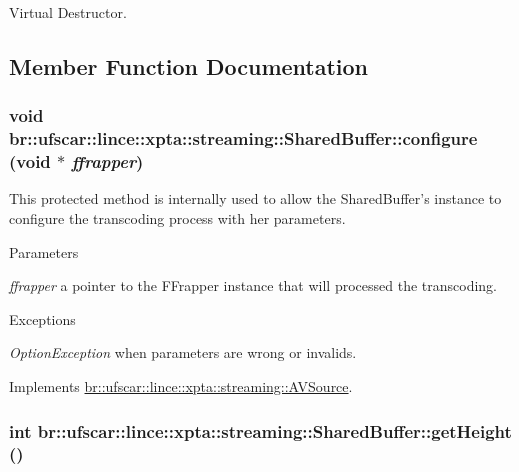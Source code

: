 Virtual Destructor. 



\subsection{Member Function Documentation}
\hypertarget{classbr_1_1ufscar_1_1lince_1_1xpta_1_1streaming_1_1SharedBuffer_af6606fe080919c0152ab9c844a82e40f}{
\subsubsection[{configure}]{\setlength{\rightskip}{0pt plus 5cm}void br::ufscar::lince::xpta::streaming::SharedBuffer::configure (void $\ast$ {\em ffrapper})}}
\label{classbr_1_1ufscar_1_1lince_1_1xpta_1_1streaming_1_1SharedBuffer_af6606fe080919c0152ab9c844a82e40f}


This protected method is internally used to allow the SharedBuffer's instance to configure the transcoding process with her parameters. 


\begin{DoxyParams}{Parameters}
\item[{\em ffrapper}]a pointer to the FFrapper instance that will processed the transcoding. \end{DoxyParams}

\begin{DoxyExceptions}{Exceptions}
\item[{\em OptionException}]when parameters are wrong or invalids. \end{DoxyExceptions}


Implements \hyperlink{classbr_1_1ufscar_1_1lince_1_1xpta_1_1streaming_1_1AVSource_a35f8e70290dafd5ad952f54c3bc44ce3}{br::ufscar::lince::xpta::streaming::AVSource}.

\hypertarget{classbr_1_1ufscar_1_1lince_1_1xpta_1_1streaming_1_1SharedBuffer_aaeb434b8cbbbafd18c1192bc4e885a75}{
\subsubsection[{getHeight}]{\setlength{\rightskip}{0pt plus 5cm}int br::ufscar::lince::xpta::streaming::SharedBuffer::getHeight ()}}
\label{classbr_1_1ufscar_1_1lince_1_1xpta_1_1streaming_1_1SharedBuffer_aaeb434b8cbbbafd18c1192bc4e885a75}



